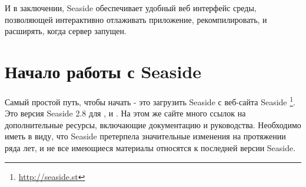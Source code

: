\documentclass[a4paper,10pt,twoside]{book}
\begin{document}

И в заключении, Seaside обеспечивает удобный веб интерфейс среды,
позволяющей интерактивно отлаживать приложение, рекомпилировать, и расширять, когда сервер запущен.


\section{Начало работы с Seaside}


Самый простой путь, чтобы начать - это загрузить Seaside
 с веб-сайта Seaside \footnote{\url{http://seaside.st}}.
Это версия Seaside 2.8 для ,  и .
На этом же сайте много ссылок на дополнительные ресурсы, включающие документацию и руководства.
Необходимо иметь в виду, что Seaside претерпела значительные изменения на протяжении ряда лет,
и не все имеющиеся материалы относятся к последней версии Seaside.

\end{document}
